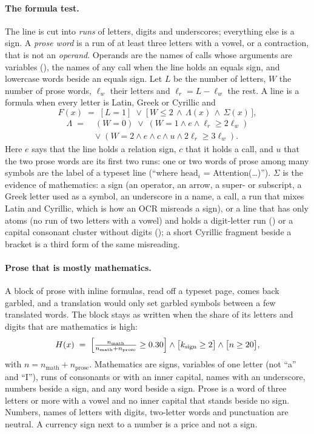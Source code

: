 \paragraph{The formula test.}
The line is cut into \emph{runs} of letters, digits and underscores; everything else is a sign. A \emph{prose word} is a run of
at least three letters with a vowel, or a contraction, that is not an \emph{operand}. Operands are the names of calls whose
arguments are variables (), the names of any call when the line holds an equals sign, and lowercase words
beside an equals sign. Let $L$ be the number of letters, $W$ the number of prose words, $\ell_w$ their letters and
$\ell_r=L-\ell_w$ the rest. A line is a formula when every letter is Latin, Greek or Cyrillic and
\begin{equation}\label{eq:formula}
F(x)\;=\;[L=1]\;\lor\;\bigl[\,W\le2\,\land\,\Lambda(x)\,\land\,\Sigma(x)\,\bigr],
\end{equation}
\begin{align*}
\Lambda\;=\;&(W{=}0)\;\lor\;(W{=}1\land e\land \ell_r\ge2\ell_w)\\
&\lor\;(W{=}2\land e\land c\land u\land 2\ell_r\ge3\ell_w).
\end{align*}
Here $e$ says that the line holds a relation sign, $c$ that it holds a call, and $u$ that the two prose words are its first two
runs: one or two words of prose among many symbols are the label of a typeset line (``where $\mathrm{head}_i$ =
Attention(\dots)''). $\Sigma$ is the evidence of mathematics: a sign (an operator, an arrow, a super- or subscript, a Greek
letter used as a symbol, an underscore in a name, a call, a run that mixes Latin and Cyrillic, which is how an OCR misreads
a sign), or a line that has only atoms (no run of two letters with a vowel) and holds a digit-letter run () or a
capital consonant cluster without digits (); a short Cyrillic fragment beside a bracket is a third form of the same misreading.

\paragraph{Prose that is mostly mathematics.}
A block of prose with inline formulas, read off a typeset page, comes back garbled, and a translation would only set garbled
symbols between a few translated words. The block stays as written when the share of its letters and digits that are
mathematics is high:
\begin{equation}\label{eq:share}
H(x)\;=\;\Bigl[\tfrac{n_{\mathrm{math}}}{n_{\mathrm{math}}+n_{\mathrm{prose}}}\ge0.30\Bigr]\land\bigl[k_{\mathrm{sign}}\ge2\bigr]\land\bigl[n\ge20\bigr],
\end{equation}
with $n=n_{\mathrm{math}}+n_{\mathrm{prose}}$. Mathematics are signs, variables of one letter (not ``a'' and ``I''), runs of consonants or with an inner capital, names with an
underscore, numbers beside a sign, and any word beside a sign. Prose is a word of three letters or more with a vowel and no inner
capital that stands beside no sign. Numbers, names of letters with digits, two-letter words and punctuation are neutral. A
currency sign next to a number is a price and not a sign.

